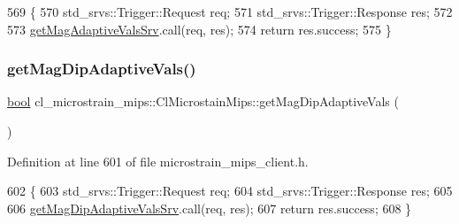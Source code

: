 \begin{DoxyCode}
569     \{
570         std\_srvs::Trigger::Request req;
571         std\_srvs::Trigger::Response res;
572 
573         \hyperlink{classcl__microstrain__mips_1_1ClMicrostainMips_a799d76ddd2e92c3624d51ffb7c4b8c89}{getMagAdaptiveValsSrv}.call(req, res);
574         \textcolor{keywordflow}{return} res.success;
575     \}
\end{DoxyCode}
\mbox{\label{classcl__microstrain__mips_1_1ClMicrostainMips_ae3642065001bd0bac34d300d5e40f6a1}} 
\subsubsection{\texorpdfstring{get\+Mag\+Dip\+Adaptive\+Vals()}{getMagDipAdaptiveVals()}}
{\footnotesize\ttfamily \hyperlink{classbool}{bool} cl\+\_\+microstrain\+\_\+mips\+::\+Cl\+Microstain\+Mips\+::get\+Mag\+Dip\+Adaptive\+Vals (\begin{DoxyParamCaption}{ }\end{DoxyParamCaption})\hspace{0.3cm}{\ttfamily [inline]}}



Definition at line 601 of file microstrain\+\_\+mips\+\_\+client.\+h.


\begin{DoxyCode}
602     \{
603         std\_srvs::Trigger::Request req;
604         std\_srvs::Trigger::Response res;
605 
606         \hyperlink{classcl__microstrain__mips_1_1ClMicrostainMips_aa5a412d1343febccf6bda432eacb0581}{getMagDipAdaptiveValsSrv}.call(req, res);
607         \textcolor{keywordflow}{return} res.success;
608     \}
\end{DoxyCode}
\mbox{\label{classcl__microstrain__mips_1_1ClMicrostainMips_aaa3a569e4b555b0db5b3f3d02ae1b33e}} 
